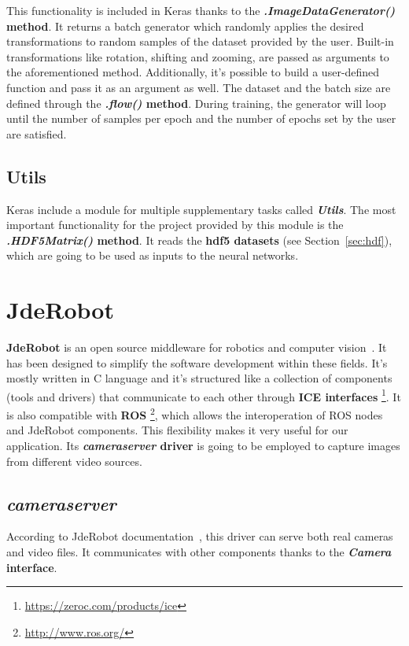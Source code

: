 This functionality is included in Keras thanks to the \textbf{\textit{.ImageDataGenerator()} method}. It returns a batch generator which randomly applies the desired transformations to random samples of the dataset provided by the user. Built-in transformations like rotation, shifting and zooming, are passed as arguments to the aforementioned method. Additionally, it's possible to build a user-defined function and pass it as an argument as well. The dataset and the batch size are defined through the \textbf{\textit{.flow()} method}. During training, the generator will loop until the number of samples per epoch and the number of epochs set by the user are satisfied.

\subsection{Utils}
Keras include a module for multiple supplementary tasks called \textbf{\textit{Utils}}. The most important functionality for the project provided by this module is the \textbf{\textit{.HDF5Matrix()} method}. It reads the \textbf{\gls{hdf5} datasets} (see Section~\ref{sec:hdf}), which are going to be used as inputs to the neural networks.

\section{JdeRobot}\label{sec:jderobot}
\textbf{JdeRobot} is an open source middleware for robotics and computer vision~\cite{jderobot}. It has been designed to simplify the software development within these fields. It's mostly written in C\nolinebreak[4]\hspace{-.05em}\raisebox{.4ex}{\tiny\bf ++} language and it's structured like a collection of components (tools and drivers) that communicate to each other through \textbf{ICE interfaces} \footnote{\url{https://zeroc.com/products/ice}}. It is also compatible with \textbf{ROS} \footnote{\url{http://www.ros.org/}}, which allows the interoperation of ROS nodes and JdeRobot components. This flexibility makes it very useful for our application.
Its \textbf{\textit{cameraserver} driver} is going to be employed to capture images from different video sources.

\subsection*{\textit{cameraserver}}
According to JdeRobot documentation~\cite{jderobot}, this driver can serve both real cameras and video files. It communicates with other components thanks to the \textbf{\textit{Camera} interface}.

